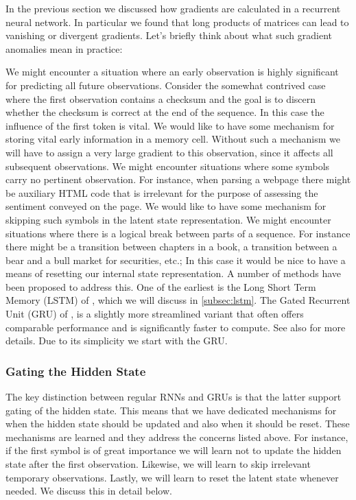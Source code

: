 In the previous section we discussed how gradients are calculated in a recurrent neural network. In particular we found that long products of matrices can lead to vanishing or divergent gradients. Let’s briefly think about what such gradient anomalies mean in practice:

We might encounter a situation where an early observation is highly significant for predicting all future observations. Consider the somewhat contrived case where the first observation contains a checksum and the goal is to discern whether the checksum is correct at the end of the sequence. In this case the influence of the first token is vital. We would like to have some mechanism for storing vital early information in a memory cell. Without such a mechanism we will have to assign a very large gradient to this observation, since it affects all subsequent observations.
We might encounter situations where some symbols carry no pertinent observation. For instance, when parsing a webpage there might be auxiliary HTML code that is irrelevant for the purpose of assessing the sentiment conveyed on the page. We would like to have some mechanism for skipping such symbols in the latent state representation.
We might encounter situations where there is a logical break between parts of a sequence. For instance there might be a transition between chapters in a book, a transition between a bear and a bull market for securities, etc.; In this case it would be nice to have a means of resetting our internal state representation.
A number of methods have been proposed to address this. One of the earliest is the Long Short Term Memory (LSTM) of \citep{Hochreiter1997}, which we will discuss in \cref{subsec:lstm}. The Gated Recurrent Unit (GRU) of \citet{Cho2014}, is a slightly more streamlined variant that often offers comparable performance and is significantly faster to compute. See also \citep{Chung2014} for more details. Due to its simplicity we start with the GRU.

\subsubsection{Gating the Hidden State}

The key distinction between regular RNNs and GRUs is that the latter support gating of the hidden state. This means that we have dedicated mechanisms for when the hidden state should be updated and also when it should be reset. These mechanisms are learned and they address the concerns listed above. For instance, if the first symbol is of great importance we will learn not to update the hidden state after the first observation. Likewise, we will learn to skip irrelevant temporary observations. Lastly, we will learn to reset the latent state whenever needed. We discuss this in detail below.

